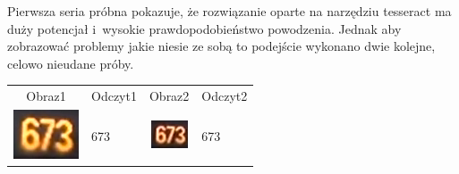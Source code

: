 Pierwsza seria próbna pokazuje, że rozwiązanie oparte na narzędziu
tesseract ma duży potencjał i~wysokie prawdopodobieństwo powodzenia.
Jednak aby zobrazować problemy jakie niesie ze sobą to podejście
wykonano dwie kolejne, celowo nieudane próby.

\begin{table}[h!]
  \centering
  \begin{tabular}{c l c l}
    Obraz1 & Odczyt1 & Obraz2 & Odczyt2  \\ 
    \begin{minipage}{.2\textwidth}
      \includegraphics[width=\textwidth]{img/exp_number_n01}
    \end{minipage}
    &
    673
    &
    \begin{minipage}{.2\textwidth}
      \includegraphics[width=\textwidth]{img/exp_number_n02}
    \end{minipage}
    &
    673
     

\end{tabular}
\end{table}
